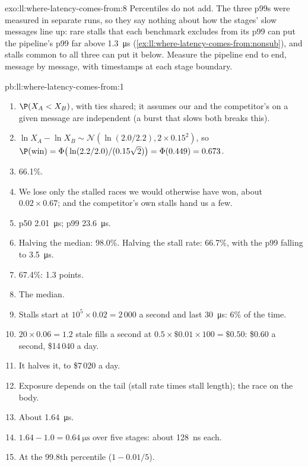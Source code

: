 \begin{solution}{exo:ll:where-latency-comes-from:8}
Percentiles do not add. The three p99s were measured in separate runs, so they say nothing about how the stages'
slow messages line up: rare stalls that each benchmark excludes from its p99 can put the pipeline's p99 far above
\qty{1.3}{\micro\second} (\cref{ex:ll:where-latency-comes-from:nonsub}), and stalls common to all three can put it
below. Measure the pipeline end to end, message by message, with timestamps at each stage boundary.
\end{solution}

\begin{solution}{pb:ll:where-latency-comes-from:1}
\begin{enumerate}
\item $\P(X_A < X_B)$, with ties shared; it assumes our  and the competitor's on a given message are
independent (a burst that slows both breaks this).
\item $\ln X_A - \ln X_B \sim \mathcal N(\ln(2.0/2.2), 2\times0.15^2)$, so $\P(\text{win}) =
\Phi\big(\ln(2.2/2.0)/(0.15\sqrt2)\big) = \Phi(0.449) = 0.673$.
\item 66.1\%.
\item We lose only the stalled races we would otherwise have won, about $0.02 \times 0.67$; and the competitor's own
stalls hand us a few.
\item p50 \qty{2.01}{\micro\second}; p99 \qty{23.6}{\micro\second}.
\item Halving the median: 98.0\%. Halving the stall rate: 66.7\%, with the p99 falling to \qty{3.5}{\micro\second}.
\item 67.4\%: 1.3 points.
\item The median.
\item Stalls start at $10^5 \times 0.02 = 2\,000$ a second and last \qty{30}{\micro\second}: 6\% of the time.
\item $20 \times 0.06 = 1.2$ stale fills a second at $0.5 \times \$0.01 \times 100 = \$0.50$: \$0.60 a second,
\$14\,040 a day.
\item It halves it, to \$7\,020 a day.
\item Exposure depends on the tail (stall rate times stall length); the race on the body.
\item About \qty{1.64}{\micro\second}.
\item $1.64 - 1.0 = \qty{0.64}{\micro\second}$ over five stages: about \qty{128}{\nano\second} each.
\item At the 99.8th percentile ($1 - 0.01/5$).

\end{enumerate}
\end{solution}
